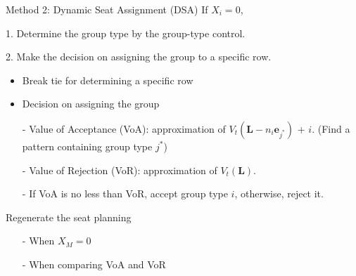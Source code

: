   
  

  
  

    


    \begin{frame}{Method 2: Dynamic Seat Assignment (DSA)}
      If $X_i = 0$,
      
      1. Determine the group type by the group-type control.

      2. Make the decision on assigning the group to a specific row.
      \begin{itemize}
        \item Break tie for determining a specific row
        \item Decision on assigning the group
        \item[-] Value of Acceptance (VoA): approximation of $V_{t} (\mathbf{L}-n_i \mathbf{e}_{j^{*}})$ + $i$. (Find a pattern containing group type $j^{*}$)
        
        \item[-] Value of Rejection (VoR): approximation of $V_{t} (\mathbf{L})$.

        \item[-] If VoA is no less than VoR, accept group type $i$, otherwise, reject it.
      \end{itemize}
      Regenerate the seat planning
      \begin{itemize}
      \item[-] When $X_{M} =0$
      \item[-] When comparing VoA and VoR 
      \end{itemize}
    \end{frame}

